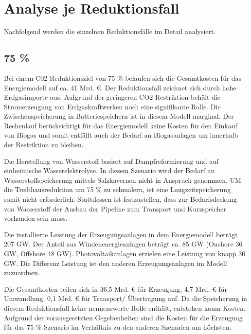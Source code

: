 \section{Analyse je Reduktionsfall}
\label{sec:reduktionsfälle}
Nachfolgend werden die einzelnen Reduktionsfälle im Detail analysiert.

\subsection{75 \%}
Bei einem C02 Reduktionsziel von 75 \% belaufen sich die Gesamtkosten für das Energiemodell auf ca. 41 Mrd. €. Der Reduktionsfall zeichnet sich durch hohe Erdgasimporte aus. Aufgrund der geringeren CO2-Restriktion behält die Stromerzeugung von Erdgaskraftwerken noch eine signifikante Rolle. Die Zwischenspeicherung in Batteriespeichern ist in diesem Modell marginal. Der Rechenlauf berücksichtigt für das Energiemodell keine Kosten für den Einkauf von Biogas und somit entfällt auch der Bedarf an Biogasanlagen um innerhalb der Restriktion zu bleiben. 

Die Herstellung von Wasserstoff basiert auf Dampfreformierung und auf einheimische Wasserelektrolyse. In diesem Szenario wird der Bedarf an Wasserstoffspeicherung mittels Salzkavernen nicht in Anspruch genommen. UM die Treibhausreduktion um 75 \% zu schmälern, ist eine Langzeitspeicherung somit nicht erforderlich. Stattdessen ist festzustellen, dass zur Bedarfsdeckung von Wasserstoff der Ausbau der Pipeline zum Transport und Kurzspeicher vorhanden sein muss. 

Die installierte Leistung der Erzeugungsanlagen in dem Energiemodell beträgt 207 GW.  Der Anteil aus Windenenergieanlagen beträgt ca. 85 GW (Onshore 36 GW, Offshore 48 GW). Photovoltaikanlagen erzielen eine Leistung von knapp 30 GW. Die Differenz Leistung ist den anderen Erzeugungsanlagen im Modell zuzuordnen. 

Die Gesamtkosten teilen sich in 36,5 Mrd. € für Erzeugung, 4,7 Mrd. € für Umwandlung, 0,1 Mrd. € für Transport/ Übertragung auf. Da die Speicherung in diesem Reduktionsfall keine nennenswerte Rolle enthält, entstehen kaum Kosten. Aufgrund der vorausgesetzten Gegebenheiten sind die Kosten für die Erzeugung für das 75 \% Szenario im Verhältnis zu den anderen Szenarien am höchsten. 


